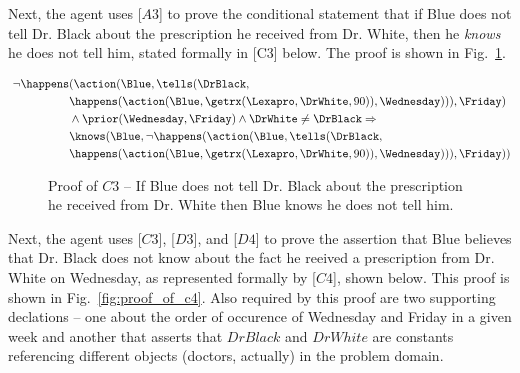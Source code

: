 \noindent Next, the agent uses [$A3$] to prove the conditional statement that if Blue does not tell Dr. Black about the prescription he received from Dr. White, then he \emph{knows} he does not tell him, stated formally in [C3] below.  The proof is shown in Fig.~\ref{fig:proof_of_c3}.

\begin{footnotesize}
\begin{align*}
[C3] \ \neg \happens&(\action(\Blue,\tells(\DrBlack,\\
& \happens(\action(\Blue,\getrx(\Lexapro,\DrWhite,90)),\Wednesday))),\Friday) \\
& \wedge \prior(\Wednesday,\Friday) \wedge \DrWhite \neq \DrBlack \Rightarrow \\
& \knows(\Blue, \neg \happens(\action(\Blue,\tells(\DrBlack,\\ 
& \happens(\action(\Blue,\getrx(\Lexapro,\DrWhite,90)),\Wednesday))),\Friday))
\end{align*}
\end{footnotesize}

\begin{figure}[h!] 
\vspace{6pt}
\centering
{}
\caption{Proof of $C3$ -- If Blue does not tell Dr. Black about the prescription he received from Dr. White then Blue knows he does not tell him.}
\label{fig:proof_of_c3}
\end{figure}



\noindent Next, the agent uses [$C3$], [$D3$], and [$D4$] to prove the assertion that Blue believes that Dr. Black does not know about the fact he reeived a prescription from Dr. White on Wednesday, as represented formally by [$C4$], shown below.  This proof is shown in Fig.~\ref{fig:proof_of_c4}.  Also required by this proof are two supporting declations -- one about the order of occurence of Wednesday and Friday in a given week and another that asserts that $DrBlack$ and $DrWhite$ are constants referencing different objects (doctors, actually) in the problem domain.

